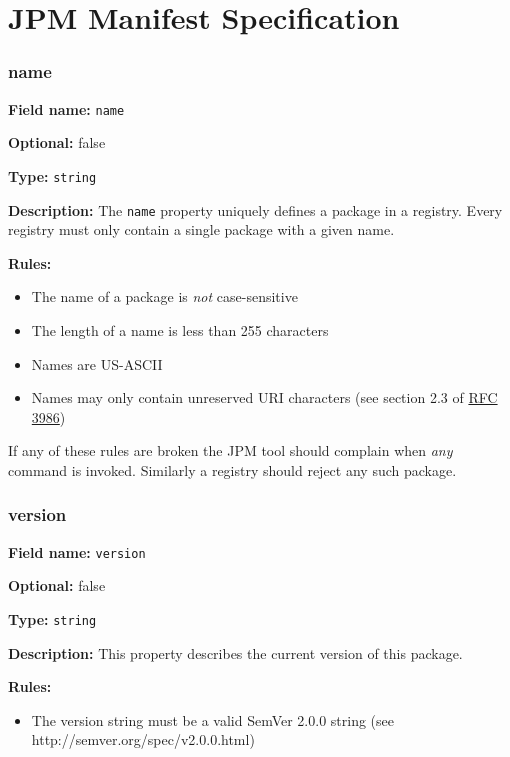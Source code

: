 \section{JPM Manifest Specification}\label{package-specification}

\hypertarget{name}{\subsubsection{name}\label{name}}

\textbf{Field name:} \texttt{name}

\textbf{Optional:} false

\textbf{Type:} \texttt{string}

\textbf{Description:} The \texttt{name} property uniquely defines a
package in a registry. Every registry must only contain a single package
with a given name.

\textbf{Rules:}

\begin{itemize}
\tightlist
\item
  The name of a package is \emph{not} case-sensitive
\item
  The length of a name is less than 255 characters
\item
  Names are US-ASCII
\item
  Names may only contain unreserved URI characters (see section 2.3 of
  \href{https://www.ietf.org/rfc/rfc3986.txt}{RFC 3986})
\end{itemize}

If any of these rules are broken the JPM tool should complain when
\emph{any} command is invoked. Similarly a registry should reject any
such package.

\hypertarget{version}{\subsubsection{version}\label{version}}

\textbf{Field name:} \texttt{version}

\textbf{Optional:} false

\textbf{Type:} \texttt{string}

\textbf{Description:} This property describes the current version of
this package.

\textbf{Rules:}

\begin{itemize}
\tightlist
\item
  The version string must be a valid SemVer 2.0.0 string (see
  http://semver.org/spec/v2.0.0.html)
\end{itemize}

